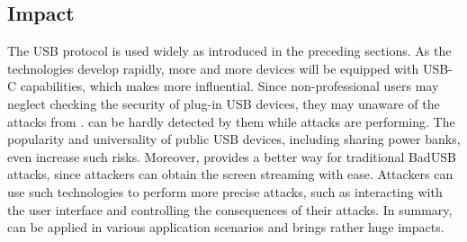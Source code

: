 \subsection{Impact}

The \ac{USB} protocol is used widely as introduced in the preceding sections.  As the
technologies develop rapidly, more and more devices will be equipped with USB-C
capabilities, which makes \tool more influential.  
Since non-professional users may neglect checking the security of plug-in \ac{USB} devices, 
they may unaware of the attacks from \tool.
can be hardly detected by them while attacks are performing.  
The popularity and universality of public \ac{USB} devices, including sharing power banks, even
increase such risks.  Moreover, \tool provides a better way for traditional
BadUSB attacks, since attackers can obtain the screen streaming with ease.
Attackers can use such technologies to perform more precise attacks, such as
interacting with the user interface and controlling the consequences of their
attacks.  In summary, \tool can be applied in various application scenarios and
brings rather huge impacts.
